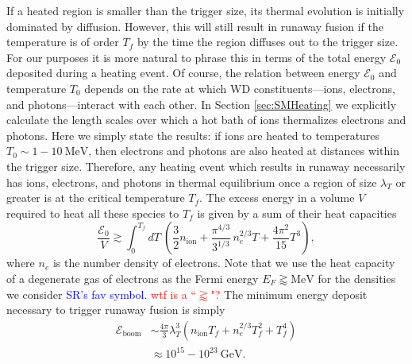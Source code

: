 \documentclass[twocolumn, preprintnumbers,amsmath,amssymb,prd, superscriptaddress]{revtex4}
\newcommand{\Ez}{\mathcal{E}_0}
\newcommand{\Eboom}{\mathcal{E}_\text{boom}}
\newcommand{\GeV}{\text{GeV}}
\newcommand{\MeV}{\text{MeV}}
\begin{document}
If a heated region is smaller than the trigger size, its thermal evolution is initially dominated by diffusion.
However, this will still result in runaway fusion if the temperature is of order $T_f$ by the time the region diffuses out to the trigger size.
For our purposes it is more natural to phrase this in terms of the total energy $\Ez$ deposited during a heating event.
Of course, the relation between energy $\Ez$ and temperature $T_0$ depends on the rate at which WD constituents---ions, electrons, and photons---interact with each other. 
In Section \ref{sec:SMHeating} we explicitly calculate the length scales over which a hot bath of ions thermalizes electrons and photons. 
Here we simply state the results: if ions are heated to temperatures $T_0 \sim 1 - 10 ~\MeV$, then electrons and photons are also heated at distances within the trigger size. 
Therefore, any heating event which results in runaway necessarily has ions, electrons, and photons in thermal equilibrium once a region of size $\lambda_T$ or greater is at the critical temperature $T_f$. 
The excess energy in a volume $V$ required to heat all these species to $T_f$ is given by a sum of their heat capacities
\begin{equation}
\label{eq:heatcapacity}
  \frac{\Ez}{V} \gtrsim \int_0^{T_f} dT ~\left(\frac32 n_\text{ion} + \frac{\pi^{4/3}}{3^{1/3}}\, n_e^{2/3} T + \frac{4 \pi^2}{15} T^3 \right),
\end{equation}
where $n_e$ is the number density of electrons.
Note that we use the heat capacity of a degenerate gas of electrons as the Fermi energy $E_F \gtrapprox \MeV$ for the densities we consider \textcolor{blue}{SR's fav symbol}.
\textcolor{red}{wtf is a ``$\gtrapprox$"?}
The minimum energy deposit necessary to trigger runaway fusion is simply
\begin{align}
\label{eq:Eboom}
\Eboom &\sim \frac{4 \pi}{3} \lambda_T^3 (n_\text{ion} T_f + n_e^{2/3} T_f^2 + T_f^4) \\
         &\approx 10^{15} - 10^{23} ~\GeV \nonumber.
\end{align}
\end{document}
